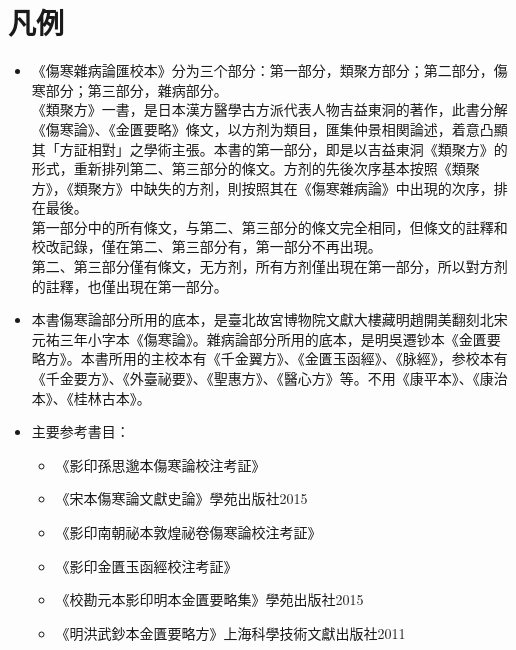 

\frontmatter
\maketitle

\chapter{凡例}

\begin{itemize}
	
	\item 《傷寒雜病論匯校本》分为三个部分：第一部分，類聚方部分；第二部分，傷寒部分；第三部分，雜病部分。\\
	《類聚方》一書，是日本漢方醫學古方派代表人物吉益東洞的著作，此書分解《傷寒論》、《金匱要略》條文，以方剂为類目，匯集仲景相関論述，着意凸顯其「方証相對」之學術主張。本書的第一部分，即是以吉益東洞《類聚方》的形式，重新排列第二、第三部分的條文。方剂的先後次序基本按照《類聚方》，《類聚方》中缺失的方剂，則按照其在《傷寒雜病論》中出現的次序，排在最後。\\
	第一部分中的所有條文，与第二、第三部分的條文完全相同，但條文的註釋和校改記錄，僅在第二、第三部分有，第一部分不再出現。\\
	第二、第三部分僅有條文，无方剂，所有方剂僅出現在第一部分，所以對方剂的註釋，也僅出現在第一部分。
	
	\item 本書傷寒論部分所用的底本，是臺北故宮博物院文獻大樓藏明趙開美翻刻北宋元祐三年小字本《傷寒論》。雜病論部分所用的底本，是明吳遷钞本《金匱要略方》。本書所用的主校本有《千金翼方》、《金匱玉函經》、《脉經》，参校本有《千金要方》、《外臺祕要》、《聖惠方》、《醫心方》等。不用《康平本》、《康治本》、《桂林古本》。
	
	\item 主要参考書目：
		\begin{itemize}
			\item 《影印孫思邈本傷寒論校注考証》
			\item 《宋本傷寒論文獻史論》學苑出版社2015
			\item 《影印南朝祕本敦煌祕卷傷寒論校注考証》
			\item 《影印金匱玉函經校注考証》
			\item 《校勘元本影印明本金匱要略集》學苑出版社2015
			\item 《明洪武鈔本金匱要略方》上海科學技術文獻出版社2011
		\end{itemize}


\end{itemize}
